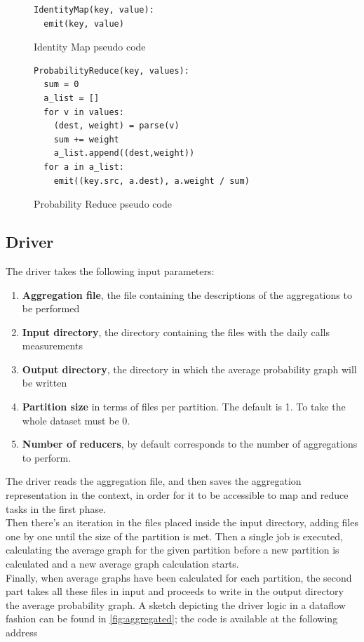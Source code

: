 \begin{figure}
\begin{verbatim}
IdentityMap(key, value):
  emit(key, value)
\end{verbatim}
\caption{Identity Map pseudo code}
\label{fig:identitymap}
\end{figure}
\begin{figure}
\begin{verbatim}
ProbabilityReduce(key, values):
  sum = 0
  a_list = []
  for v in values:
    (dest, weight) = parse(v)
    sum += weight
  	a_list.append((dest,weight))
  for a in a_list:
    emit((key.src, a.dest), a.weight / sum)
\end{verbatim}
\caption{Probability Reduce pseudo code}
\label{fig:probabilityreduce}
\end{figure}
\subsection{Driver}
The driver takes the following input parameters:
\begin{enumerate}
\item \textbf{Aggregation file}, the file containing the descriptions of the aggregations to be performed
\item \textbf{Input directory}, the directory containing the files with the daily calls measurements
\item \textbf{Output directory}, the directory in which the average probability graph will be written
\item \textbf{Partition size} in terms of files per partition. The default is 1. To take the whole dataset must be 0.
\item \textbf{Number of reducers}, by default corresponds to the number of aggregations to perform.
\end{enumerate}
The driver reads the aggregation file, and then saves the aggregation representation in the context, in order for it to be accessible to map and reduce tasks in the first phase.\\
Then there's an iteration in the files placed inside the input directory, adding files one by one until the size of the partition is met.
Then a single job is executed, calculating the average graph for the given partition before a new partition is calculated and a new average graph calculation starts. \\
Finally, when average graphs have been calculated for each partition, the second part takes all these files in input and proceeds to write in the output directory the average probability graph.
A sketch depicting the driver logic in a dataflow fashion can be found in \ref{fig:aggregated}; the code is available at the following address %

